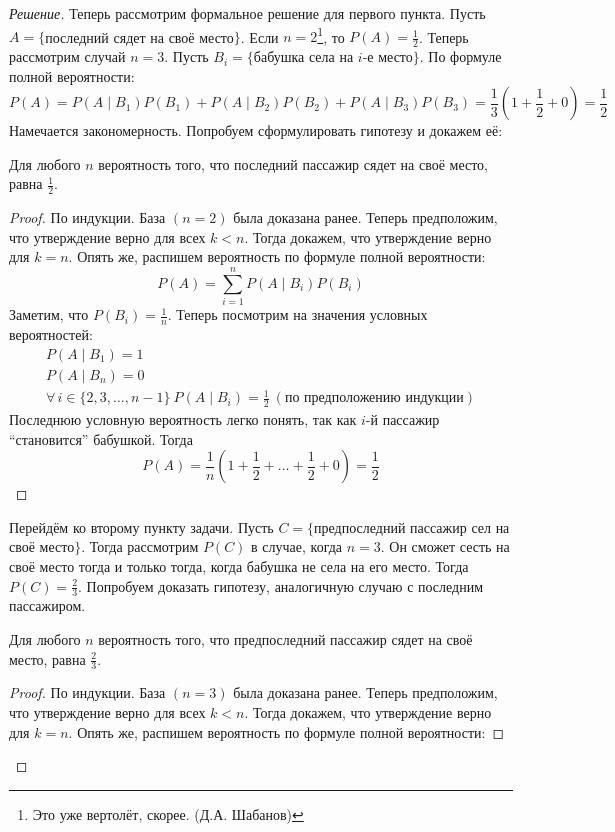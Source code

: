 \documentclass[a4paper,12pt]{article}
\begin{document}
\begin{proof}[Решение]
		Теперь рассмотрим формальное решение для первого пункта. Пусть \(A = \{\)последний сядет на своё место\(\}\). Если \(n = 2\)\footnote{Это уже вертолёт, скорее. (Д.А. Шабанов)}, то \(P(A) = \frac{1}{2}\). Теперь рассмотрим случай \(n = 3\). Пусть \(B_{i} = \{\)бабушка села на \(i\)-е место\(\}\). По формуле полной вероятности:
		\[P(A) = P(A \mid B_{1})P(B_{1}) + P(A \mid B_{2})P(B_{2}) + P(A \mid B_{3})P(B_{3}) = \frac{1}{3}\left(1 + \frac{1}{2} + 0\right) = \frac{1}{2}\]
		Намечается закономерность. Попробуем сформулировать гипотезу и докажем её:
		\begin{hypothesis}
			Для любого \(n\) вероятность того, что последний пассажир сядет на своё место, равна \(\frac{1}{2}\).
		\end{hypothesis}
		\begin{proof}
			По индукции. База \((n = 2)\) была доказана ранее. Теперь предположим, что утверждение верно для всех \(k < n\). Тогда докажем, что утверждение верно для \(k = n\). Опять же, распишем вероятность по формуле полной вероятности:
			\[P(A) = \sum\limits_{i = 1}^{n} P(A \mid B_{i})P(B_{i})\]
			Заметим, что \(P(B_{i}) = \frac{1}{n}\). Теперь посмотрим на значения условных вероятностей:
			\[\begin{array}{l}
			P(A \mid B_{1}) = 1 \\
			P(A \mid B_{n}) = 0 \\
			\forall\,i \in \{2, 3, \ldots, n - 1\}\ P(A \mid B_{i}) = \frac{1}{2}\ (\text{по предположению индукции})
			\end{array}\]
			Последнюю условную вероятность легко понять, так как \(i\)-й пассажир ``становится'' бабушкой. Тогда
			\[P(A) = \frac{1}{n}\left(1 + \frac{1}{2} + \ldots + \frac{1}{2} + 0\right) = \frac{1}{2}\]
		\end{proof}
		Перейдём ко второму пункту задачи. Пусть \(C = \{\)предпоследний пассажир сел на своё место\(\}\). Тогда рассмотрим \(P(C)\) в случае, когда \(n = 3\). Он сможет сесть на своё место тогда и только тогда, когда бабушка не села на его место. Тогда \(P(C) = \frac{2}{3}\). Попробуем доказать гипотезу, аналогичную случаю с последним пассажиром.
		\begin{hypothesis}
			Для любого \(n\) вероятность того, что предпоследний пассажир сядет на своё место, равна \(\frac{2}{3}\).
		\end{hypothesis}
		\begin{proof}
			По индукции. База \((n = 3)\) была доказана ранее. Теперь предположим, что утверждение верно для всех \(k < n\). Тогда докажем, что утверждение верно для \(k = n\). Опять же, распишем вероятность по формуле полной вероятности:

\end{proof}
\end{proof}
\end{document}
